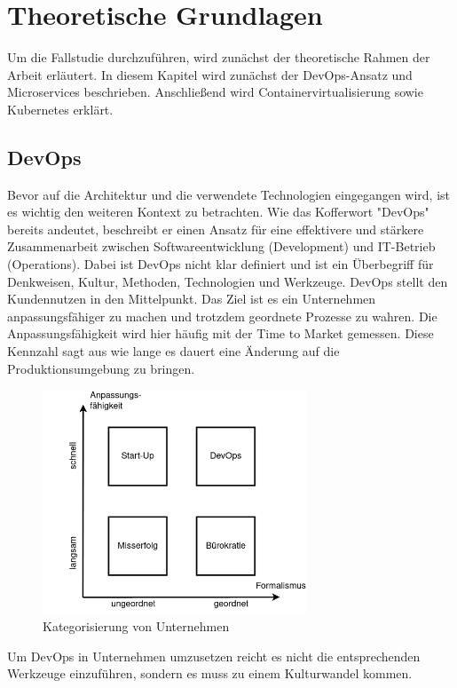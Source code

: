 \section{Theoretische Grundlagen}

Um die Fallstudie durchzuführen, wird zunächst der theoretische Rahmen der Arbeit erläutert. In diesem Kapitel wird zunächst der DevOps-Ansatz und Microservices beschrieben. Anschließend wird Containervirtualisierung sowie Kubernetes erklärt.

\subsection{DevOps}

Bevor auf die Architektur und die verwendete Technologien eingegangen wird, ist es wichtig den weiteren Kontext zu betrachten. Wie das Kofferwort "DevOps" bereits andeutet, beschreibt er einen Ansatz für eine effektivere und stärkere Zusammenarbeit zwischen Softwareentwicklung (Development) und IT-Betrieb (Operations). Dabei ist DevOps nicht klar definiert und ist ein Überbegriff für Denkweisen, Kultur, Methoden, Technologien und Werkzeuge. DevOps stellt den Kundennutzen in den Mittelpunkt. Das Ziel ist es ein Unternehmen anpassungsfähiger zu machen und trotzdem   geordnete Prozesse zu wahren. Die Anpassungsfähigkeit wird hier häufig mit der Time to Market gemessen. Diese Kennzahl sagt aus wie lange es dauert eine Änderung auf die Produktionsumgebung zu bringen.

\begin{figure}[H] 
    \centering
    \includegraphics[width=0.7\textwidth]{figures/DevOpsDiagramm.png}
    \caption{Kategorisierung von Unternehmen}
\end{figure}

Um DevOps in Unternehmen umzusetzen reicht es nicht die entsprechenden Werkzeuge einzuführen, sondern es muss zu einem Kulturwandel kommen.


